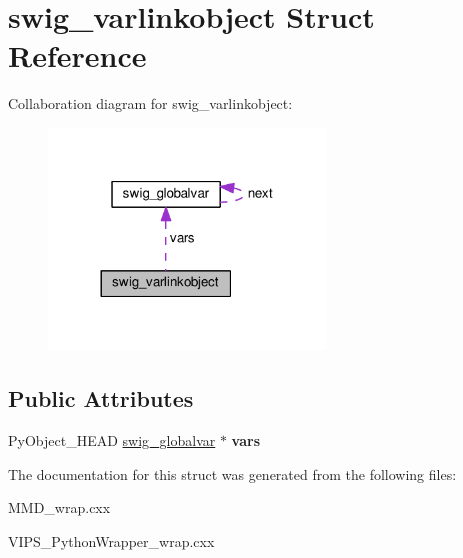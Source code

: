 \hypertarget{structswig__varlinkobject}{}\section{swig\+\_\+varlinkobject Struct Reference}
\label{structswig__varlinkobject}


Collaboration diagram for swig\+\_\+varlinkobject\+:\nopagebreak
\begin{figure}[H]
\begin{center}
\leavevmode
\includegraphics[width=209pt]{structswig__varlinkobject__coll__graph}
\end{center}
\end{figure}
\subsection*{Public Attributes}
\begin{DoxyCompactItemize}
\item 
Py\+Object\+\_\+\+H\+E\+AD \hyperlink{structswig__globalvar}{swig\+\_\+globalvar} $\ast$ {\bfseries vars}\hypertarget{structswig__varlinkobject_a7c03e9f19969e73923a456aefd82ff05}{}\label{structswig__varlinkobject_a7c03e9f19969e73923a456aefd82ff05}

\end{DoxyCompactItemize}


The documentation for this struct was generated from the following files\+:\begin{DoxyCompactItemize}
\item 
M\+M\+D\+\_\+wrap.\+cxx\item 
V\+I\+P\+S\+\_\+\+Python\+Wrapper\+\_\+wrap.\+cxx\end{DoxyCompactItemize}
